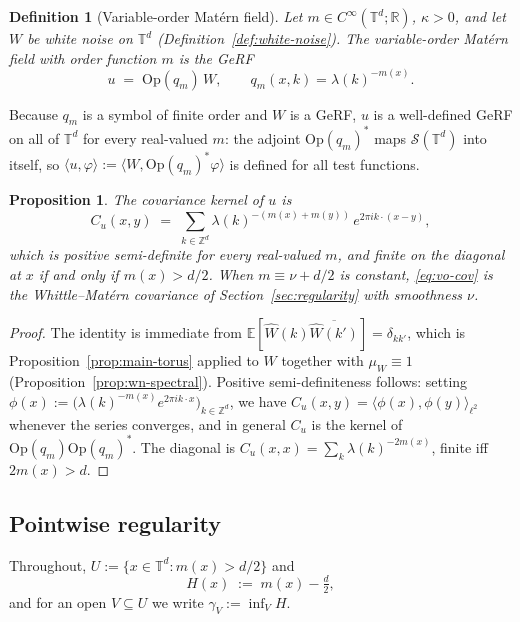 \documentclass[pdflatex,sn-mathphys,Numbered]{sn-jnl}
\theoremstyle{thmstyleone}%
\newtheorem{proposition}[theorem]{Proposition}%
\theoremstyle{thmstyletwo}%
\theoremstyle{thmstylethree}%
\newtheorem{definition}[theorem]{Definition}%
\newcommand{\RR}{\mathbb{R}}
\newcommand{\ZZ}{\mathbb{Z}}
\newcommand{\TT}{\mathbb{T}}
\newcommand{\calS}{\mathcal{S}}
\newcommand{\Op}{\mathrm{Op}}
\newcommand{\E}{\mathbb{E}}
\begin{document}
\begin{definition}[Variable-order Mat\'ern field]\label{def:vo-matern}
Let $m\in C^\infty(\TT^d;\RR)$, $\kappa>0$, and let $W$ be white noise on
$\TT^d$ (Definition~\ref{def:white-noise}). The \emph{variable-order Mat\'ern
field with order function $m$} is the GeRF
\[
    u \;=\; \Op(q_m)\,W, \qquad q_m(x,k) = \lambda(k)^{-m(x)} .
\]
\end{definition}

Because $q_m$ is a symbol of finite order and $W$ is a GeRF, $u$ is a
well-defined GeRF on all of $\TT^d$ for every real-valued $m$: the adjoint
$\Op(q_m)^*$ maps $\calS(\TT^d)$ into itself, so
$\langle u,\varphi\rangle := \langle W, \Op(q_m)^*\varphi\rangle$ is defined for
all test functions.

\begin{proposition}\label{prop:vo-cov}
The covariance kernel of $u$ is
\begin{equation}\label{eq:vo-cov}
    C_u(x,y) \;=\; \sum_{k\in\ZZ^d}
        \lambda(k)^{-\left(m(x)+m(y)\right)} \, e^{2\pi i k\cdot(x-y)} ,
\end{equation}
which is positive semi-definite for every real-valued $m$, and finite on the
diagonal at $x$ if and only if $m(x) > d/2$. When $m \equiv \nu + d/2$ is
constant, \eqref{eq:vo-cov} is the Whittle--Mat\'ern covariance of
Section~\ref{sec:regularity} with smoothness $\nu$.
\end{proposition}

\begin{proof}
The identity is immediate from $\E[\hat W(k)\overline{\hat W(k')}]=\delta_{kk'}$,
which is Proposition~\ref{prop:main-torus} applied to $W$ together with
$\mu_W \equiv 1$ (Proposition~\ref{prop:wn-spectral}).
Positive semi-definiteness follows: setting
$\phi(x) := \bigl(\lambda(k)^{-m(x)} e^{2\pi i k\cdot x}\bigr)_{k\in\ZZ^d}$, we
have $C_u(x,y) = \langle \phi(x),\phi(y)\rangle_{\ell^2}$ whenever the series
converges, and in general $C_u$ is the kernel of $\Op(q_m)\Op(q_m)^*$. The
diagonal is $C_u(x,x) = \sum_k \lambda(k)^{-2m(x)}$, finite iff $2m(x)>d$.
\end{proof}

\subsection{Pointwise regularity}

Throughout, $U := \{x\in\TT^d : m(x) > d/2\}$ and
\[
    H(x) \;:=\; m(x) - \tfrac d2 ,
\]
and for an open $V \subseteq U$ we write $\gamma_V := \inf_V H$.
\end{document}
